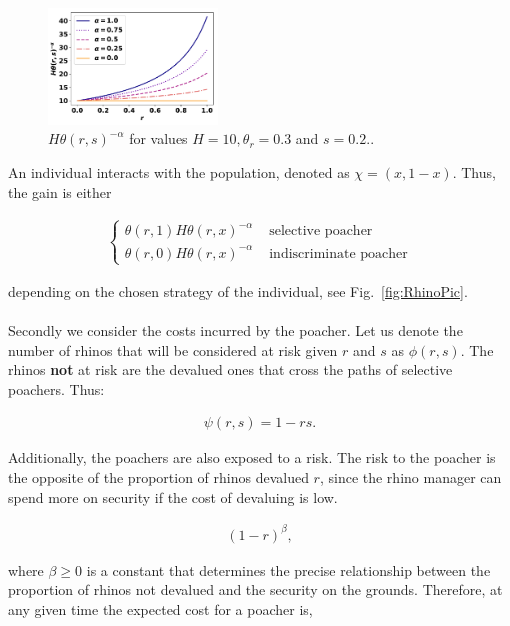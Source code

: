 \documentclass[10pt]{article}
\begin{document}
\begin{figure}[!htbp]
\centering
\includegraphics[width=0.4\textwidth]{images/gain_curve.pdf}
\caption{\label{fig:GainCurve} \(H \theta(r, s) ^{- \alpha}\) for values 
\(H = 10, \theta_r = 0.3\) and \(s = 0.2.\).}
\end{figure}

An individual interacts with the population, denoted as \(\chi=(x, 1 -x )\). Thus,
the gain is either

\begin{eqnarray}
	\label{eqn:gain}
	\left\{
	\begin{array}{cl}
	\theta(r, 1) H \theta(r, x)^{-\alpha} & \mbox{ selective poacher}
	\\
	\theta(r, 0) H \theta(r, x)^{-\alpha} & \mbox{ indiscriminate poacher}
	\end{array} \right.
\end{eqnarray}

depending on the chosen strategy of the individual, see Fig.~\ref{fig:RhinoPic}.
\\
\\
Secondly we consider the costs incurred by the poacher. Let us denote the number
of rhinos that will be considered at risk given \(r\) and \(s\) as \(\phi(r,s)\).
The rhinos \textbf{not} at risk are the devalued ones 
that cross the paths of selective poachers. Thus:

\begin{eqnarray}
	\label{eqn:psi}
	\psi(r, s) = 1 - rs.
\end{eqnarray}

Additionally, the poachers are also exposed to a risk. The risk to the poacher is
the opposite of the proportion of rhinos devalued \(r\), since the rhino manager
can spend more on security if the cost of devaluing is low.

\begin{eqnarray}
	\label{eqn:risk}
	(1 - r)^{\beta},
\end{eqnarray}

where \(\beta \geq 0\) is a constant that determines the precise relationship between
the proportion of rhinos not devalued and the security on the grounds. Therefore,
at any given time the expected cost for a poacher is, 
\end{document}

